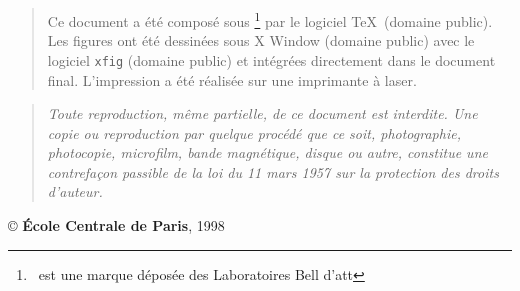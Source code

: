 \thispagestyle{empty}
    \begin{quote}
	Ce document a \'et\'e compos\'e sous
	\unix\footnote{\unix\  est une
	marque d\'epos\'ee des  Laboratoires  Bell d'{\sc att}}
	par le logiciel
	\TeX\ (domaine  public).  Les figures ont \'et\'e dessin\'ees sous X
	Window  (domaine  public) avec le logiciel {\tt xfig} (domaine
	public)  et  int\'egr\'ees  directement  dans le  document  final.
	L'impression  a \'et\'e  r\'ealis\'ee  sur  une  imprimante  \`a  laser.
    \end{quote}

    \vfill

    \begin {quote}
	\em Toute  reproduction,  m\^eme  partielle,  de ce document est
	interdite.  Une copie ou reproduction  par quelque proc\'ed\'e que
	ce   soit,   photographie,    photocopie,   microfilm,   bande
	magn\'etique,   disque  ou  autre,   constitue  une  contrefa\c con
	passible  de la loi du 11  mars  1957  sur la  protection  des
	droits d'auteur.
    \end {quote}

    \begin {center}
        \copyright { \bf \'Ecole Centrale de Paris}, 1998
    \end {center}
